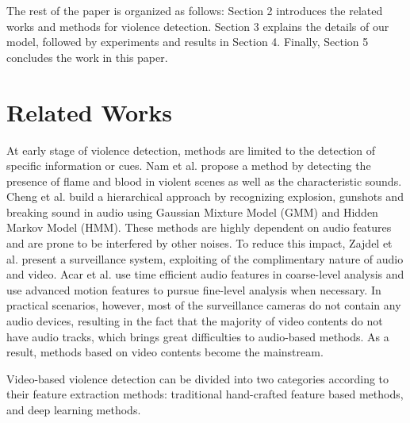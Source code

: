 \documentclass[10pt,twocolumn,letterpaper]{article}
\begin{document}
The rest of the paper is organized as follows: Section 2 introduces the related works and methods for violence detection. Section 3 explains the details of our model, followed by experiments and results in Section 4. Finally, Section 5 concludes the work in this paper.


\section{Related Works}

At early stage of violence detection, methods are limited to the detection of specific information or cues. 
Nam et al. \cite{nam1998audio} propose a method by detecting the presence of flame and blood in violent scenes as well as the characteristic sounds. 
Cheng et al. \cite{cheng2003semantic} build a  hierarchical approach by recognizing explosion, gunshots and breaking sound in audio using Gaussian Mixture Model (GMM) and Hidden Markov Model (HMM). 
These methods are highly dependent on audio features and are prone to be interfered by other noises. 
To reduce this impact, Zajdel et al. \cite{zajdel2007cassandra} present a surveillance system, exploiting of the complimentary nature of audio and video.
Acar et al. \cite{acar2016breaking} use time efficient audio features in coarse-level analysis and use advanced motion features to pursue fine-level analysis when necessary.
In practical scenarios, however, most of the surveillance cameras do not contain any audio devices, resulting in the fact that  the majority of video contents do not have audio tracks, which brings great difficulties to audio-based methods. 
As a result, methods based on video contents become the mainstream. 

Video-based violence detection can be divided into two categories according to their feature extraction methods:
traditional hand-crafted feature based methods, and deep learning methods.
\end{document}
